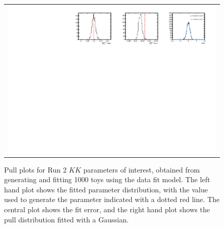 \begin{figure}
\begin{tabular}{c}
\includegraphics[width=\textwidth]{ANA_resources/Plots/Data_fit/FitterBias//R_ds_KK_run2.pdf} \\
  \end{tabular}
  \caption{Pull plots for Run 2 $KK$ parameters of interest, obtained from generating and fitting 1000 toys using the data fit model. The left hand plot shows the fitted parameter distribution, with the value used to generate the parameter indicated with a dotted red line. The central plot shows the fit error, and the right hand plot shows the pull distribution fitted with a Gaussian.}
\label{fig:KK_run2_pulls}
\end{figure}
